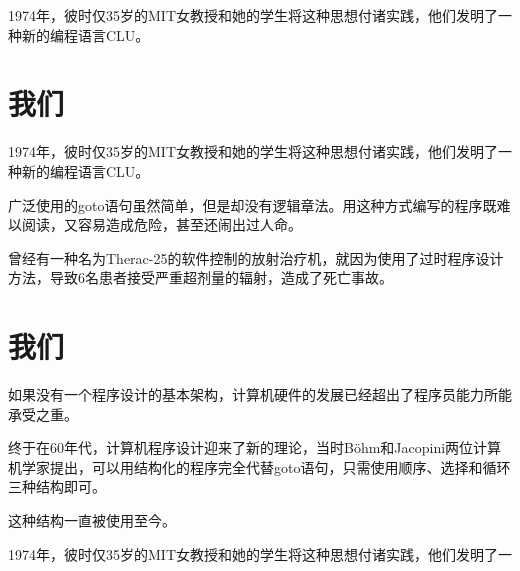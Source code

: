 \documentclass[custom]{linearbook}
\begin{document}
1974年，彼时仅35岁的MIT女教授和她的学生将这种思想付诸实践，他们发明了一种新的编程语言CLU。
\section{我们}
1974年，彼时仅35岁的MIT女教授和她的学生将这种思想付诸实践，他们发明了一种新的编程语言CLU。

广泛使用的goto语句虽然简单，但是却没有逻辑章法。用这种方式编写的程序既难以阅读，又容易造成危险，甚至还闹出过人命。

曾经有一种名为Therac-25的软件控制的放射治疗机，就因为使用了过时程序设计方法，导致6名患者接受严重超剂量的辐射，造成了死亡事故。
\section{我们}
如果没有一个程序设计的基本架构，计算机硬件的发展已经超出了程序员能力所能承受之重。

终于在60年代，计算机程序设计迎来了新的理论，当时Böhm和Jacopini两位计算机学家提出，可以用结构化的程序完全代替goto语句，只需使用顺序、选择和循环三种结构即可。

这种结构一直被使用至今。

1974年，彼时仅35岁的MIT女教授和她的学生将这种思想付诸实践，他们发明了一


\end{document}
